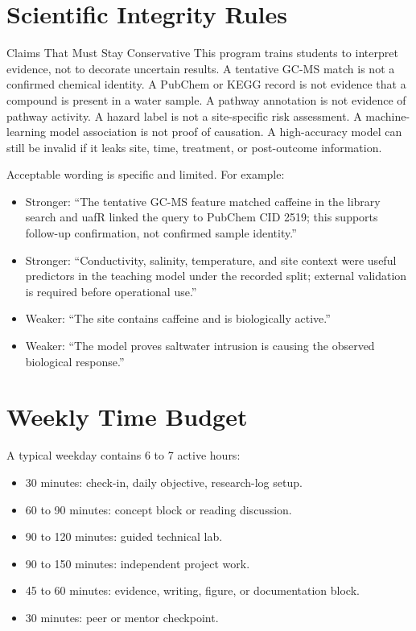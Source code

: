 \section{Scientific Integrity Rules}

\begin{cautionbox}{Claims That Must Stay Conservative}
This program trains students to interpret evidence, not to decorate uncertain results. A tentative GC-MS match is not a confirmed chemical identity. A PubChem or KEGG record is not evidence that a compound is present in a water sample. A pathway annotation is not evidence of pathway activity. A hazard label is not a site-specific risk assessment. A machine-learning model association is not proof of causation. A high-accuracy model can still be invalid if it leaks site, time, treatment, or post-outcome information.
\end{cautionbox}

Acceptable wording is specific and limited. For example:
\begin{itemize}
  \item Stronger: ``The tentative GC-MS feature matched caffeine in the library search and uafR linked the query to PubChem CID 2519; this supports follow-up confirmation, not confirmed sample identity.''
  \item Stronger: ``Conductivity, salinity, temperature, and site context were useful predictors in the teaching model under the recorded split; external validation is required before operational use.''
  \item Weaker: ``The site contains caffeine and is biologically active.''
  \item Weaker: ``The model proves saltwater intrusion is causing the observed biological response.''
\end{itemize}

\section{Weekly Time Budget}

A typical weekday contains 6 to 7 active hours:
\begin{itemize}
  \item 30 minutes: check-in, daily objective, research-log setup.
  \item 60 to 90 minutes: concept block or reading discussion.
  \item 90 to 120 minutes: guided technical lab.
  \item 90 to 150 minutes: independent project work.
  \item 45 to 60 minutes: evidence, writing, figure, or documentation block.
  \item 30 minutes: peer or mentor checkpoint.
\end{itemize}

